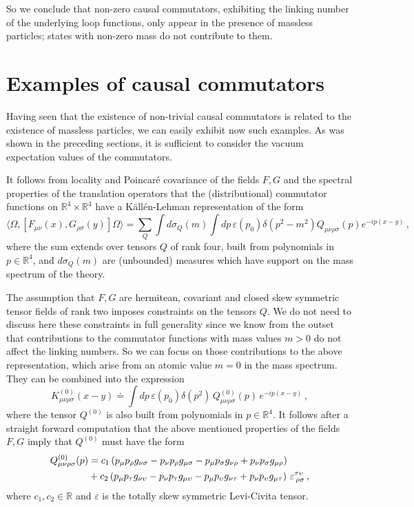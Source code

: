 \documentclass[11pt]{article}
\numberwithin{equation}{section}
\newcommand{\RR}{{\mathbb R}}
\begin{document}
So we conclude that non-zero causal commutators, exhibiting the
linking number of the underlying loop functions, only appear
in the presence of massless particles; states with non-zero mass do not 
contribute to them.  

\section{Examples of causal commutators }
\label{sec5}

Having seen that the existence of non-trivial causal commutators 
is related to the existence of massless particles, 
we can easily exhibit now such examples. As was shown in the preceding
sections, it is sufficient to consider the vacuum expectation 
values of the commutators.

\medskip 
It follows from locality and Poincar\'e covariance 
of the fields  $F,G$ and 
the spectral properties of the translation 
operators that the (distributional)  
commutator functions on $\RR^4 \times \RR^4$ have a 
K\"all\'en-Lehman representation of the form 
$$
\langle \Omega, [F_{\mu \nu}(x), G_{\rho \sigma}(y) ] \Omega \rangle = \sum_Q
\!  \!
\int \! d \sigma_Q(m) \!  \! 
\int \! dp \, \varepsilon(p_0) \delta(p^2 - m^2) 
Q_{\mu \nu \rho \sigma}(p) e^{-ip(x-y)} \, ,
$$
where the sum extends over tensors $Q$ of rank four,   
built from polynomials in $p \in \RR^4$, 
and $d \sigma_Q(m)$ are (unbounded)  
measures which have support on the mass
spectrum of the theory. 

\medskip 
The assumption that $F,G$ are hermitean, covariant and closed skew symmetric  
tensor fields of rank two imposes constraints on the tensors $Q$. 
We do not need to discuss here these constraints in full
generality since we know from the outset that contributions to the 
commutator functions with mass values $m>0$ 
do not affect the linking numbers. So we can focus on those
contributions to the above representation, which arise from an 
atomic value $m=0$ in the mass spectrum. They can be combined into
the expression
\begin{equation}
\label{e.5.1}
K^{(0)}_{\mu \nu \rho \sigma}(x-y) \doteq 
\int \! dp \, \varepsilon(p_0) \delta(p^2) 
\, Q^{(0)}_{\mu \nu \rho \sigma}(p) \, e^{-ip(x-y)} \, , 
\end{equation} 
where the tensor $ Q^{(0)}$ is also built from  
polynomials in $p \in \RR^4$. It follows after a straight forward
computation that the above mentioned properties of the fields $F,G$ 
imply that $Q^{(0)}$ must have the form
\begin{align}
\label{e.5.2}
Q^{(0)}_{\mu \nu \rho \sigma}(p) & =
c_1 \, (p_\mu p_\rho g_{\nu \sigma}  - p_\nu p_\rho g_{\mu \sigma}
- p_\mu p_\sigma g_{\nu \rho} + p_\nu p_\sigma g_{\mu \rho}) \notag\\
& + c_2 \, (p_\mu p_\tau g_{\nu \upsilon}  - p_\nu p_\tau g_{\mu \upsilon}
- p_\mu p_\upsilon g_{\nu \tau} + p_\nu p_\upsilon g_{\mu \tau}) \ 
\varepsilon^{\tau \upsilon}_{\, \rho \sigma} \, , 
\end{align}
where $c_1, c_2 \in \RR$ and $\varepsilon$ is the 
totally skew symmetric Levi-Civita tensor. 
\end{document}
